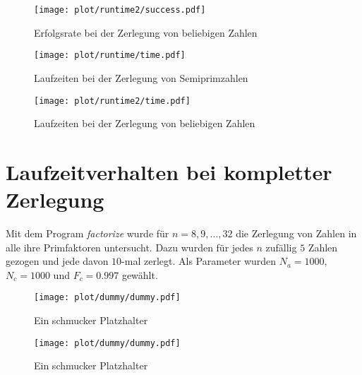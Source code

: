 \begin{figure}[ht]
		\centering
		\texttt{[image: plot/runtime2/success.pdf]}
		\caption{Erfolgsrate bei der Zerlegung von beliebigen Zahlen}\label{fig:runtime2-success}
\end{figure}
\begin{figure}[ht]
		\centering
		\texttt{[image: plot/runtime/time.pdf]}
		\caption{Laufzeiten bei der Zerlegung von Semiprimzahlen}\label{fig:runtime-runtime}
\end{figure}
\begin{figure}[ht]
		\centering
		\texttt{[image: plot/runtime2/time.pdf]}
		\caption{Laufzeiten bei der Zerlegung von beliebigen Zahlen}\label{fig:runtime2-runtime}
\end{figure}

\section{Laufzeitverhalten bei kompletter Zerlegung}
Mit dem Program \textit{factorize} wurde für $n=8,9,\dots,32$ die Zerlegung von Zahlen in alle ihre Primfaktoren untersucht. Dazu wurden für jedes $n$ zufällig $5$ Zahlen gezogen und jede davon $10$-mal zerlegt. Als Parameter wurden $N_a=1000$, $N_c=1000$ und $F_c=0.997$ gewählt.
\begin{figure}[ht]
		\centering
		\texttt{[image: plot/dummy/dummy.pdf]}
		\caption{Ein schmucker Platzhalter}
\end{figure}
\begin{figure}[ht]
		\centering
		\texttt{[image: plot/dummy/dummy.pdf]}
		\caption{Ein schmucker Platzhalter}
\end{figure}
